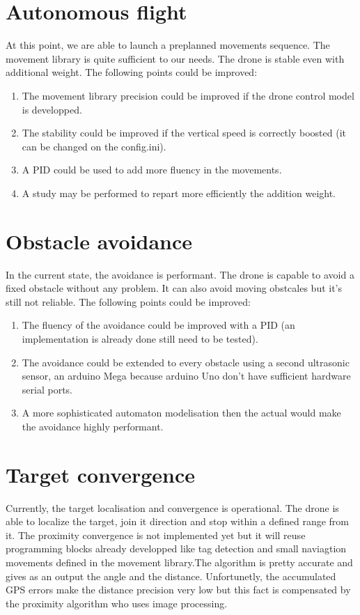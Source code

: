 \section{Autonomous flight}

At this point, we are able to launch a preplanned movements sequence. The movement library is quite sufficient to our needs.
The drone is stable even with additional weight. 
The following points  could be improved:

\begin{enumerate}
\item The movement library precision could be improved if the drone control model is developped.
\item The stability could be improved if the vertical speed is correctly boosted (it can be changed on the config.ini).
\item A PID could be used to add more fluency in the movements.
\item A study may be performed to repart more efficiently the addition weight.
\end{enumerate}

\section{Obstacle avoidance}
In the current state, the avoidance is performant. The drone is capable to avoid a fixed obstacle without any problem.
It can also avoid moving obstcales but it's still not reliable.
The following points could be improved:
\begin{enumerate}
\item The fluency of the avoidance could be improved with a PID (an implementation is already done still need to be tested).
\item The avoidance could be extended to every obstacle using a second ultrasonic sensor, an arduino Mega because arduino Uno don't have sufficient hardware serial ports.
\item A more sophisticated automaton modelisation then the actual would make the avoidance highly performant.
\end{enumerate}

\section{Target convergence}
Currently, the target localisation and convergence is operational. The drone is able to localize the target, join it direction and stop within a defined range from it. The proximity convergence is not implemented yet but it will reuse programming blocks already developped like tag detection and small naviagtion movements defined in the movement library.The algorithm is pretty accurate and gives as an output the angle and the distance. Unfortunetly, the accumulated GPS errors make the distance precision very low but this fact is compensated by the proximity algorithm who uses image processing.

